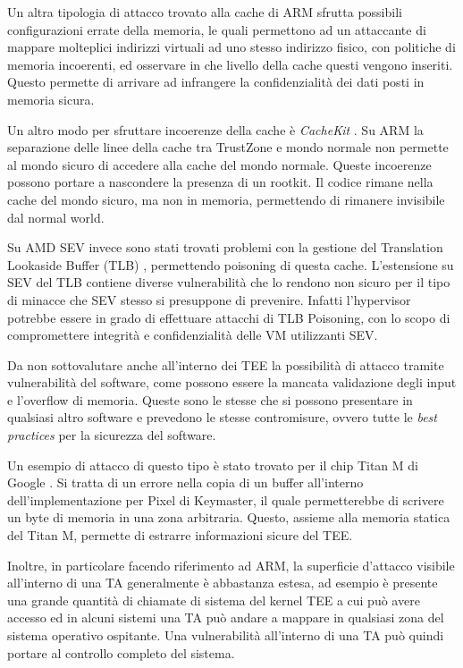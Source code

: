\documentclass[12pt,italian]{report}
\begin{document}
	Un altra tipologia di attacco trovato alla cache di ARM \cite{aliasdriven} sfrutta possibili configurazioni errate della memoria, le quali permettono ad un attaccante di mappare molteplici indirizzi virtuali ad uno stesso indirizzo fisico, con politiche di memoria incoerenti, ed osservare in che livello della cache questi vengono inseriti. Questo permette di arrivare ad infrangere la confidenzialità dei dati posti in memoria sicura.
	
	Un altro modo per sfruttare incoerenze della cache è \textit{CacheKit} \cite{zhang2016cachekit}. Su ARM la separazione delle linee della cache tra TrustZone e mondo normale non permette al mondo sicuro di accedere alla cache del mondo normale. Queste incoerenze possono portare a nascondere la presenza di un rootkit. Il codice rimane nella cache del mondo sicuro, ma non in memoria, permettendo di rimanere invisibile dal normal world.
	
	Su AMD SEV invece sono stati trovati problemi con la gestione del Translation Lookaside Buffer (TLB) \cite{li2021tlb}, permettendo poisoning di questa cache. L'estensione su SEV del TLB contiene diverse vulnerabilità che lo rendono non sicuro per il tipo di minacce che SEV stesso si presuppone di prevenire. Infatti l'hypervisor potrebbe essere in grado di effettuare attacchi di TLB Poisoning, con lo scopo di compromettere integrità e confidenzialità delle VM utilizzanti SEV.
	
	\bigbreak 
	
	Da non sottovalutare anche all'interno dei TEE la possibilità di attacco tramite vulnerabilità del software, come possono essere la mancata validazione degli input e l'overflow di memoria. Queste sono le stesse che si possono presentare in qualsiasi altro software e prevedono le stesse contromisure, ovvero tutte le \textit{best practices} per la sicurezza del software.
	
	Un esempio di attacco di questo tipo è stato trovato per il chip Titan M di Google \cite{attack_titanM}. Si tratta di un errore nella copia di un buffer all'interno dell'implementazione per Pixel di Keymaster, il quale permetterebbe di scrivere un byte di memoria in una zona arbitraria. Questo, assieme alla memoria statica del Titan M, permette di estrarre informazioni sicure del TEE.
	
	
	Inoltre, in particolare facendo riferimento ad ARM, la superficie d'attacco visibile all'interno di una TA generalmente è abbastanza estesa, ad esempio è presente una grande quantità di chiamate di sistema del kernel TEE a cui può avere accesso ed in alcuni sistemi una TA può andare a mappare in qualsiasi zona del sistema operativo ospitante. Una vulnerabilità all'interno di una TA può quindi portare al controllo completo del sistema.
	
\end{document}
